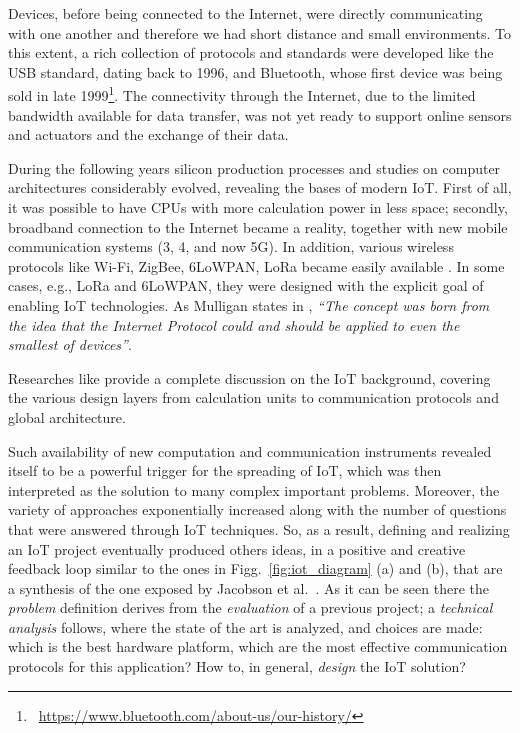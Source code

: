 Devices, before being connected to the Internet, were directly communicating with one another and therefore we had short distance and small environments. To this extent, a rich collection of protocols and standards were developed like the USB standard, dating back to 1996, and Bluetooth, whose first device was being sold in late 1999\footnote{\faBluetooth~\url{https://www.bluetooth.com/about-us/our-history/}}. The connectivity through the Internet, due to the limited bandwidth available for data transfer, was not yet ready to support online sensors and actuators and the exchange of their data. 

During the following years silicon production processes and studies on computer architectures considerably evolved, revealing the bases of modern IoT. First of all, it was possible to have CPUs with more calculation power in less space; secondly, broadband connection to the Internet became a reality, together with new mobile communication systems (3, 4, and now 5G). In addition, various wireless protocols like Wi-Fi, ZigBee, 6LoWPAN, LoRa became easily available \cite{al2017internet}. In some cases, e.g., LoRa and 6LoWPAN, they were designed with the explicit goal of enabling IoT technologies. As Mulligan states in \cite{mulligan20076lowpan}, \textit{``The concept was born from the idea that the Internet Protocol could and should be applied to even the smallest of devices''}.

Researches like \cite{samie2016iot, guth2018detailed} provide a complete discussion on the IoT background, covering the various design layers from calculation units to communication protocols and global architecture.

Such availability of new computation and communication instruments revealed itself to be a powerful trigger for the spreading of IoT, which was then interpreted as the solution to many complex important problems. Moreover, the variety of approaches exponentially increased along with the number of questions that were answered through IoT techniques. So, as a result, defining and realizing an IoT project eventually produced others ideas, in a positive and creative feedback loop similar to the ones in Figg.~\ref{fig:iot_diagram} (a) and (b), that are a synthesis of the one exposed by Jacobson et al.~\cite{jacobson2017there}. As it can be seen there the \textit{problem} definition derives from the \textit{evaluation} of a previous project; a \textit{technical analysis} follows, where the state of the art is analyzed, and choices are made: which is the best hardware platform, which are the most effective communication protocols for this application? How to, in general, \textit{design} the IoT solution? 

